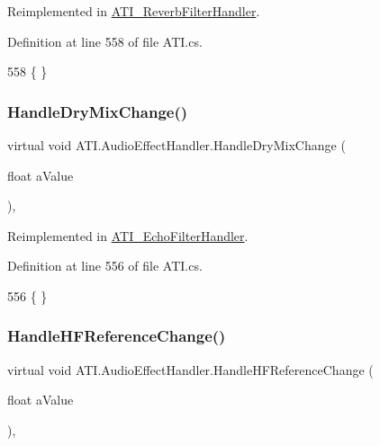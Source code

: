 Reimplemented in \hyperlink{class_a_t_i___reverb_filter_handler_a0af6a4381b725183fdb7cc8589a9f71f}{A\+T\+I\+\_\+\+Reverb\+Filter\+Handler}.



Definition at line 558 of file A\+T\+I.\+cs.


\begin{DoxyCode}
558 \{ \}
\end{DoxyCode}
\mbox{\label{class_a_t_i_1_1_audio_effect_handler_a8d83371e2e982373b4eb04198a8514fb}} 
\subsubsection{\texorpdfstring{Handle\+Dry\+Mix\+Change()}{HandleDryMixChange()}}
{\footnotesize\ttfamily virtual void A\+T\+I.\+Audio\+Effect\+Handler.\+Handle\+Dry\+Mix\+Change (\begin{DoxyParamCaption}\item[{float}]{a\+Value }\end{DoxyParamCaption})\hspace{0.3cm}{\ttfamily [protected]}, {\ttfamily [virtual]}}



Reimplemented in \hyperlink{class_a_t_i___echo_filter_handler_afc69af9ea7789eb655c01c851594716a}{A\+T\+I\+\_\+\+Echo\+Filter\+Handler}.



Definition at line 556 of file A\+T\+I.\+cs.


\begin{DoxyCode}
556 \{ \}
\end{DoxyCode}
\mbox{\label{class_a_t_i_1_1_audio_effect_handler_a183b75c93279e0d6322a0e005c590891}} 
\subsubsection{\texorpdfstring{Handle\+H\+F\+Reference\+Change()}{HandleHFReferenceChange()}}
{\footnotesize\ttfamily virtual void A\+T\+I.\+Audio\+Effect\+Handler.\+Handle\+H\+F\+Reference\+Change (\begin{DoxyParamCaption}\item[{float}]{a\+Value }\end{DoxyParamCaption})\hspace{0.3cm}{\ttfamily [protected]}, {\ttfamily [virtual]}}



